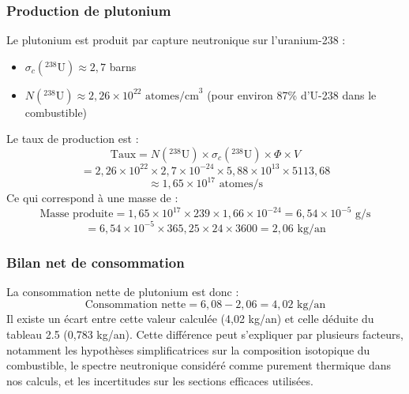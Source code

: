 \documentclass{article}
\begin{document}
\subsubsection{Production de plutonium}
Le plutonium est produit par capture neutronique sur l'uranium-238 :
\begin{itemize}
  \item $\sigma_c(^{238}\text{U}) \approx 2,7$ barns
  \item $N(^{238}\text{U}) \approx 2,26 \times 10^{22} \text{ atomes/cm}^3$ (pour environ 87\% d'U-238 dans le combustible)
\end{itemize}
Le taux de production est :
\begin{equation}
  \text{Taux} = N(^{238}\text{U}) \times \sigma_c(^{238}\text{U}) \times \Phi \times V
\end{equation}
\begin{equation}
  = 2,26 \times 10^{22} \times 2,7 \times 10^{-24} \times 5,88 \times 10^{13} \times 5 113,68
\end{equation}
\begin{equation}
  \approx 1,65 \times 10^{17} \text{ atomes/s}
\end{equation}
Ce qui correspond à une masse de :
\begin{equation}
  \text{Masse produite} = 1,65 \times 10^{17} \times 239 \times 1,66 \times 10^{-24} = 6,54 \times 10^{-5} \text{ g/s}
\end{equation}
\begin{equation}
  = 6,54 \times 10^{-5} \times 365,25 \times 24 \times 3600 = 2,06 \text{ kg/an}
\end{equation}

\subsubsection{Bilan net de consommation}
La consommation nette de plutonium est donc :
\begin{equation}
  \text{Consommation nette} = 6,08 - 2,06 = 4,02 \text{ kg/an}
\end{equation}
Il existe un écart entre cette valeur calculée (4,02 kg/an) et celle déduite du tableau 2.5 (0,783 kg/an). Cette différence peut s'expliquer par plusieurs facteurs, notamment les hypothèses simplificatrices sur la composition isotopique du combustible, le spectre neutronique considéré comme purement thermique dans nos calculs, et les incertitudes sur les sections efficaces utilisées.
\end{document}
